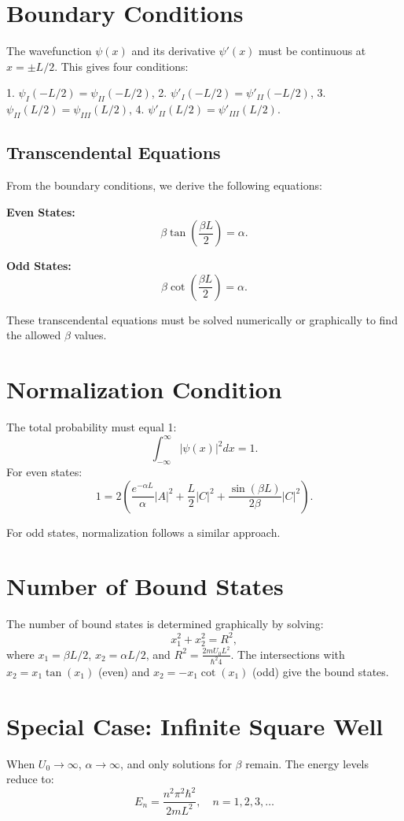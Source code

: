 \documentclass[a4paper,12pt]{article}
\begin{document}
\begin{multicols}{2}
\section{Boundary Conditions}
The wavefunction \( \psi(x) \) and its derivative \( \psi'(x) \) must be continuous at \( x = \pm L/2 \). This gives four conditions:

1. \( \psi_I(-L/2) = \psi_{II}(-L/2) \),
2. \( \psi'_I(-L/2) = \psi'_{II}(-L/2) \),
3. \( \psi_{II}(L/2) = \psi_{III}(L/2) \),
4. \( \psi'_{II}(L/2) = \psi'_{III}(L/2) \).

\subsection{Transcendental Equations}
From the boundary conditions, we derive the following equations:

\textbf{Even States:}
\[
\beta \tan\left(\frac{\beta L}{2}\right) = \alpha.
\]

\textbf{Odd States:}
\[
\beta \cot\left(\frac{\beta L}{2}\right) = \alpha.
\]

These transcendental equations must be solved numerically or graphically to find the allowed \( \beta \) values.

\section{Normalization Condition}
The total probability must equal 1:
\[
\int_{-\infty}^\infty |\psi(x)|^2 dx = 1.
\]
For even states:
\[
1 = 2\left( \frac{e^{-\alpha L}}{\alpha}|A|^2 + \frac{L}{2}|C|^2 + \frac{\sin(\beta L)}{2\beta}|C|^2 \right).
\]

For odd states, normalization follows a similar approach.

\section{Number of Bound States}
The number of bound states is determined graphically by solving:
\[
x_1^2 + x_2^2 = R^2,
\]
where \( x_1 = \beta L/2 \), \( x_2 = \alpha L/2 \), and \( R^2 = \frac{2mU_0 L^2}{\hbar^2 4} \). The intersections with \( x_2 = x_1 \tan(x_1) \) (even) and \( x_2 = -x_1 \cot(x_1) \) (odd) give the bound states.

\section{Special Case: Infinite Square Well}
When \( U_0 \to \infty \), \( \alpha \to \infty \), and only solutions for \( \beta \) remain. The energy levels reduce to:
\[
E_n = \frac{n^2 \pi^2 \hbar^2}{2mL^2}, \quad n = 1, 2, 3, \dots
\]
\end{multicols}
\end{document}
